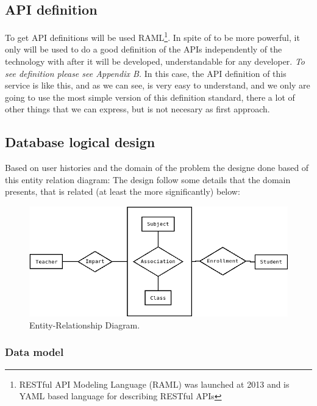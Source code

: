 \subsection{API definition}

To get API definitions will be used  RAML\footnote{ RESTful API Modeling Language
(RAML) was launched at 2013 and is YAML based language for describing RESTful APIs }.
In spite of to be more powerful, it only will be used to do a good definition of the
APIs independently of the technology with after it will be developed, understandable
for any developer.
\intro
\textit{To see definition please see Appendix B.}
\intro
In this case, the API definition of this service is like this, and as we can see,
is very easy to understand, and we only are going to use the most simple
version of this definition standard, there a lot of other things that we can
express, but is not necesary as first approach.





\subsection{Database logical design}

Based on user histories and the domain of the problem the designe
done based of this entity relation diagram:
\intro
The design follow some details that the domain presents, that is related
(at least the more significantly) below:

\begin{figure}[H]
  \includegraphics[scale=0.4]{img/diagrams/dbms-ER.png}
  \centering
  \caption{Entity-Relationship Diagram.}
\end{figure}


\subsubsection{Data model}

